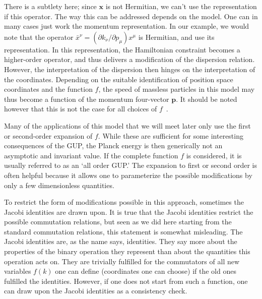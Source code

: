 \documentclass{article}
\begin{document}
There is a subtlety here; since $\mathbf{x}$ is not Hermitian, we can't use the representation if this operator. 
The way this can be addressed depends on the model. One can in many cases just work the momentum representation.
In our example, we would note that the operator $\bar x^\nu = (\partial k_\nu /\partial p_\mu ) x^\mu$ is Hermitian, and use
its representation. In this representation, the Hamiltonian constraint becomes a higher-order operator,
and thus delivers a modification of the dispersion relation. However, the interpretation of the dispersion
then hinges on the interpretation of the coordinates. Depending on the suitable identification of position space
coordinates and the function $f$, the speed of massless particles in this model may thus become a function of the momentum 
four-vector $\mathbf{p}$. It should be noted however that this is not the case for all 
choices of $f$~\cite{Hossenfelder:2005ed}.

Many of the applications of this model that we
will meet later only use the first or second-order expansion of $f$. While these are sufficient for some interesting
consequences of the {\sc GUP}, the
Planck energy is then generically not an asymptotic and invariant value. If the complete function $f$ is considered,
it is usually referred to as an `all order GUP.' The
expansion to first or second order is often 
helpful because it allows one to parameterize the possible modifications by only a few dimensionless
quantities. 

To restrict the form of modifications possible in this approach, sometimes the Jacobi identities 
are drawn upon. %
It is true that the Jacobi identities restrict the possible commutation
relations, but seen as we did here starting from the standard commutation relations, this statement is
somewhat misleading. The Jacobi identities are, as the name says, identities. They say more about the 
properties of the binary operation they represent than about the quantities this operation acts on. 
They are trivially  fulfilled for the commutators of all new variables $f(k)$ one can define (coordinates one can choose) if the old ones fulfilled the 
identities. However, if one does not start from such a function, one can draw upon the Jacobi identities as a consistency
check. 
\end{document}
